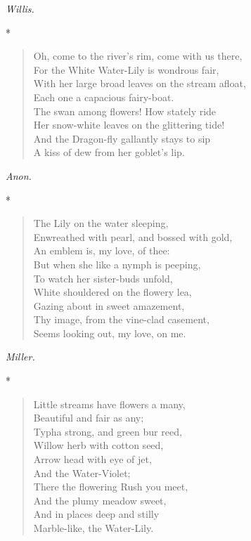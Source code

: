 \documentclass[11pt,twoside]{article}
\newcommand\stars{\begin{center}*\quad*\quad*\end{center}}
\newcommand\by[1]{\par\hfill\textit{#1}\par}
\begin{document}
\by{Willis.}

\stars

\begin{verse}
Oh, come to the river’s rim, come with us there,\\
For the White Water-Lily is wondrous fair,\\
With her large broad leaves on the stream afloat,\\
Each one a capacious fairy-boat.\\
The swan among flowers! How stately ride\\
Her snow-white leaves on the glittering tide!\\
And the Dragon-fly gallantly stays to sip\\
A kiss of dew from her goblet’s lip.
\end{verse}

\by{Anon.}

\stars

\begin{verse}
The Lily on the water sleeping,\\
\quad Enwreathed with pearl, and bossed with gold,\\
\quad An emblem is, my love, of thee:\\
But when she like a nymph is peeping,\\
\quad To watch her sister-buds unfold,\\
\quad White shouldered on the flowery lea,\\
\quad Gazing about in sweet amazement,\\
\quad Thy image, from the vine-clad casement,\\
\quad Seems looking out, my love, on me.
\end{verse}

\by{Miller.}

\stars

\begin{verse}
Little streams have flowers a many,\\
Beautiful and fair as any;\\
Typha strong, and green bur reed,\\
Willow herb with cotton seed,\\
Arrow head with eye of jet,\\
And the Water-Violet;\\
There the flowering Rush you meet,\\
And the plumy meadow sweet,\\
And in places deep and stilly\\
Marble-like, the Water-Lily.
\end{verse}
\end{document}
